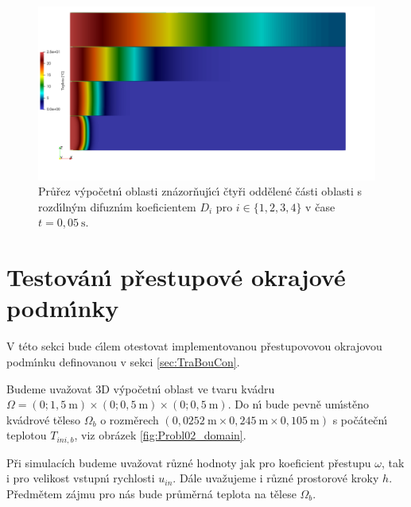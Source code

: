         \begin{figure}[H]
            \centering
            \includegraphics[width=\linewidth]{Img/Kapitola 3/Diffus_problem.png}
            \caption{Pr\r{u}\v{r}ez v\'{y}po\v{c}etn\'{\i} oblasti zn\'{a}zor\v{n}uj\'{\i}c\'{\i} \v{c}ty\v{r}i odd\v{e}len\'{e} \v{c}\'{a}sti oblasti s rozd\'{\i}ln\'{y}m difuzn\'{\i}m koeficientem $D_i$ pro $i \in \{1,2,3,4\}$ v \v{c}ase $t = 0{,}05 \ \mathrm{s}$. }
        \end{figure}
 


    \section{Testov\'{a}n\'{\i} p\v{r}estupov\'{e} okrajov\'{e} podm\'{\i}nky}
    \label{sec:TranConTest}

        V t\'{e}to sekci bude c\'{\i}lem otestovat implementovanou p\v{r}estupovovou okrajovou podm\'{\i}nku definovanou v sekci \ref{sec:TraBouCon}.
        
        Budeme uva\v{z}ovat 3D v\'{y}po\v{c}etn\'{\i} oblast ve tvaru kv\'{a}dru $\Omega = (0;1{,}5 \ \mathrm{m}) \times (0;0{,}5 \ \mathrm{m}) \times (0;0{,}5 \ \mathrm{m})$. Do n\'{\i} bude pevn\v{e} um\'{\i}st\v{e}no kv\'{a}drov\'{e} t\v{e}leso $\Omega_b$ o rozm\v{e}rech $(0{,}0252 \ \mathrm{m} \times 0{,}245 \ \mathrm{m} \times 0{,}105 \ \mathrm{m})$ s po\v{c}\'{a}te\v{c}n\'{\i} teplotou $T_{ini,b}$, viz obr\'{a}zek \ref{fig:Probl02_domain}. 
        
        P\v{r}i simulac\'{i}ch budeme uva\v{z}ovat r\r{u}zn\'{e} hodnoty jak pro koeficient p\v{r}estupu $\omega$, tak i pro velikost vstupn\'{\i} rychlosti $u_{in}$. D\'{a}le uva\v{z}ujeme i r\r{u}zn\'{e} prostorov\'{e} kroky $h$. P\v{r}edm\v{e}tem z\'{a}jmu pro n\'{a}s bude pr\r{u}m\v{e}rn\'{a} teplota na t\v{e}lese $\Omega_b$.

